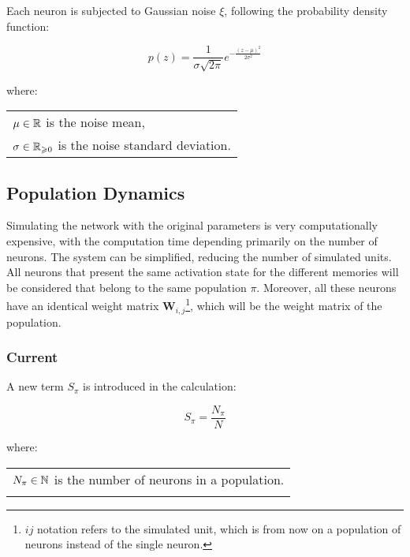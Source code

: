     Each neuron is subjected to Gaussian noise \(\xi\), following the probability density function:

        \begin{equation}
            p(z) = \frac{1}{\sigma \sqrt{ 2 \pi}} e^{ - \frac{ (z - \mu)^2 } {2 \sigma^2} }
        \label{eq:noise} \end{equation}

        where:

        \begin{tabular}{l} \\
            \(\mu \in \mathbb{R}\) is the noise mean, \\
            \(\sigma \in \mathbb{R}_{\geqslant 0}\) is the noise standard deviation.
        \label{tab:conditions_noise} \end{tabular} \bigskip


\subsection{Population Dynamics}
\label{subsec:population_dynamics}

    Simulating the network with the original parameters is very computationally expensive, with the computation time depending primarily on the number of neurons.
    The system can be simplified, reducing the number of simulated units.
    All neurons that present the same activation state for the different memories will be considered that belong to the same population \(\pi\).
    Moreover, all these neurons have an identical weight matrix \(\boldsymbol{W}_{i, j}\)\footnote{\(i j\) notation refers to the simulated unit, which is from now on a population of neurons instead of the single neuron.}, which will be the weight matrix of the population.


\subsubsection{Current}

    A new term \(S_{\pi}\) is introduced in the calculation:

        \begin{equation}
            S_{\pi} = \frac{N_{\pi}}{N}
        \label{eq:fraction_neurons_pop} \end{equation}

        where:

        \begin{tabular}{l} \\
            \(N_{\pi} \in \mathbb{N}\) is the number of neurons in a population. \\
        \label{tab:fraction_neurons_pop} \end{tabular} \bigskip


